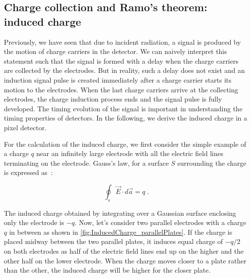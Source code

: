 \subsection{Charge collection and Ramo's theorem: induced charge}
\label{sec:RamoTheorem}

Previously, we have seen that due to incident radiation, a signal is
produced by the motion of charge carriers in the detector. We can
naively interpret this statement such that the signal is formed with a
delay when the charge carriers are collected by the electrodes. But in
reality, such a delay does not exist and an induction signal pulse is
created immediately after a charge carrier starts its motion to the
electrodes. When the last charge carriers arrive at the collecting
electrodes, the charge induction process ends and the signal pulse is
fully developed. The timing evolution of the signal is important in
understanding the timing properties of detectors. In the following, we
derive the induced charge in a pixel detector.

For the calculation of the induced charge, we first consider the
simple example of a charge $q$ near an infinitely large electrode with
all the electric field lines terminating on the electrode. Gauss's
law, for a surface $S$ surrounding the charge is expressed
as~\cite{Spieler2005}:

\begin{equation}
\oint_{s} \vec{E} \cdot d\vec{a}=q\; .
\label{eq:GaussLaw}
\end{equation}

The induced charge obtained by integrating over a Gaussian surface
enclosing only the electrode is $-q$. Now, let's consider two parallel
electrodes with a charge $q$ in between as shown in
\cref{fig:InducedCharge_parallelPlates}. If the charge is placed
midway between the two parallel plates, it induces equal charge of
$-q/2$ on both electrodes as half of the electric field lines end up
on the higher and the other half on the lower electrode. When the
charge moves closer to a plate rather than the other, the induced
charge will be higher for the closer plate.

